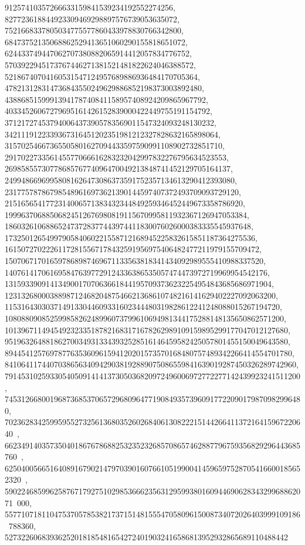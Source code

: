 {{{   91257410357266633159841539234192552274256, 
   827723618844923309469298897576739053635072, 
   7521668337805034775577860433978830766342800, 
   68473752135068862529413651060290155818651072, 
   624433749447062707380882065914412057834776752, 
   5703922945173767446271381521481822624046388572, 
   52186740704160531547124957689886936484170705364, 
   478213128314736843550249629886852198373003892480, 
   4388685159991394178740841158957408924209865967792, 
   40334526067279695161426152839000422449755191154792, 
   371217274537940064373905783569011547324093248130232, 
   3421119122339367316451202351981212327828632165898064, 
   31570254667365505801627094433597590991108902732851710, 
   291702273356145577066616283232042997832276795634523553, 
   2698585573077868576774096470049213848741452129705164137, 
   24994866969958081626473086373591752357134613290412393080, 
   231775787867985489616973621390144597407372493709093729120, 
   2151656541772314006571383432344849259346452449673358786920, 
   19996370688506824512676980819115670995811932367126947053384, 
   186032610688652473728377443974411830076026000383335545937648, 
   1732501265499790584060221558712168945225832615851187364275536, 
   16150727022261172815567178432591956975406482477211979155709472, 
   150706717016597868987469671133563818341434092989555410988337520, 
   1407614170616958476397729124336386535057474473972719969954542176, 
   13159339091413490017070636618441957093736232254954843685686971904, 
   123132680003889871246820487546621368610748216141629402227092063200, 
   1153164303037149133044609331602344480319828612241248088015267194720, 
   10808809085259985826248996073799610694981344175288148135650862571200, 
   101396711494549232335187821683171678262989109159895299177047012127680, 
   951963264881862700349313343932528516146459582425057801455150049643580, 
   8944541257697877635360961594120201573570168480757489342266414554701780, 
   84106411744070386563409429038192889075086559841639019287450326289742960, 
   791453102593305405091414137305036820972496006972772277142439923241511200, 
   7453126680019687368537065729680964771908493573960917722090179870982996480, 
   70236283425995955273256136803526026840613082221514426641137216415967220640\
, 
   662349140357350401867678688253235232685708657462887796759356829296443685760\
, 
   6250400566516408916790214797039016076610519900414596597528705416600185652320\
, 
   59022468599625876717927510298536662356312959938016094469062834329968862071\
000, 557710718110475370578538217371514815554705809615008734072026403999109186\
788360, 527322606839362520181854816542724019032416586813952932865689110488442\
}}}
